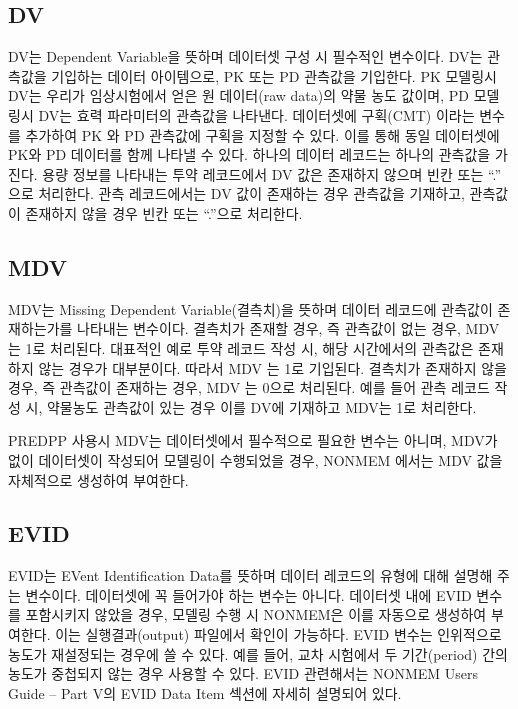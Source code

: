 \documentclass[
  10pt,
]{krantz}
\begin{document}
\hypertarget{dv}{%
\subsection{DV}\label{dv}}

DV는 Dependent Variable을 뜻하며 데이터셋 구성 시 필수적인 변수이다. DV는 관측값을 기입하는 데이터 아이템으로, PK 또는 PD 관측값을 기입한다. PK 모델링시 DV는 우리가 임상시험에서 얻은 원 데이터(raw data)의 약물 농도 값이며, PD 모델링시 DV는 효력 파라미터의 관측값을 나타낸다. 데이터셋에 구획(CMT) 이라는 변수를 추가하여 PK 와 PD 관측값에 구획을 지정할 수 있다. 이를 통해 동일 데이터셋에 PK와 PD 데이터를 함께 나타낼 수 있다. 하나의 데이터 레코드는 하나의 관측값을 가진다. 용량 정보를 나타내는 투약 레코드에서 DV 값은 존재하지 않으며 빈칸 또는 ``.'' 으로 처리한다. 관측 레코드에서는 DV 값이 존재하는 경우 관측값을 기재하고, 관측값이 존재하지 않을 경우 빈칸 또는 ``.''으로 처리한다.

\hypertarget{mdv}{%
\subsection{MDV}\label{mdv}}

MDV는 Missing Dependent Variable(결측치)을 뜻하며 데이터 레코드에 관측값이 존재하는가를 나타내는 변수이다. 결측치가 존재할 경우, 즉 관측값이 없는 경우, MDV 는 1로 처리된다. 대표적인 예로 투약 레코드 작성 시, 해당 시간에서의 관측값은 존재하지 않는 경우가 대부분이다. 따라서 MDV 는 1로 기입된다. 결측치가 존재하지 않을 경우, 즉 관측값이 존재하는 경우, MDV 는 0으로 처리된다. 예를 들어 관측 레코드 작성 시, 약물농도 관측값이 있는 경우 이를 DV에 기재하고 MDV는 1로 처리한다.

PREDPP 사용시 MDV는 데이터셋에서 필수적으로 필요한 변수는 아니며, MDV가 없이 데이터셋이 작성되어 모델링이 수행되었을 경우, NONMEM 에서는 MDV 값을 자체적으로 생성하여 부여한다.

\hypertarget{evid}{%
\subsection{EVID}\label{evid}}

EVID는 EVent Identification Data를 뜻하며 데이터 레코드의 유형에 대해 설명해 주는 변수이다. 데이터셋에 꼭 들어가야 하는 변수는 아니다. 데이터셋 내에 EVID 변수를 포함시키지 않았을 경우, 모델링 수행 시 NONMEM은 이를 자동으로 생성하여 부여한다. 이는 실행결과(output) 파일에서 확인이 가능하다. EVID 변수는 인위적으로 농도가 재설정되는 경우에 쓸 수 있다. 예를 들어, 교차 시험에서 두 기간(period) 간의 농도가 중첩되지 않는 경우 사용할 수 있다. EVID 관련해서는 NONMEM Users Guide -- Part V의 EVID Data Item 섹션에 자세히 설명되어 있다.
\end{document}
